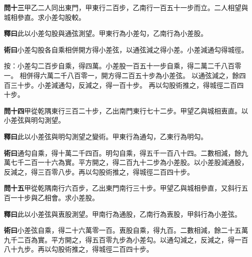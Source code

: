\documentclass[12pt,a4paper]{article}
\begin{document}
\noindent\textbf{問十三}\quad 甲乙二人同出東門，甲東行二百步，乙南行一百五十一步而立。二人相望與城相參直。求小差勾股較。

\vspace{0.3em}

\noindent\textbf{釋曰}\quad 此以小差勾股與通弦測望。甲東行為小差勾，乙南行為小差股。

\vspace{0.3em}

\noindent\textbf{術曰}\quad 小差勾股各自乘相併開方得小差弦，以通弦減之得小差。小差減通勾得城徑。

\vspace{0.3em}

\noindent
按：小差勾二百步自乘，得四萬。小差股一百五十一步自乘，得二萬二千八百零一。
相併得六萬二千八百零一，開方得二百五十步為小差弦。
以通弦減之，餘四百三十步。小差減通勾，反減之，得一百十步。
再以勾股術推之，得城徑二百四十步。

\vspace{0.5em}

\noindent\textbf{問十四}\quad 甲從乾隅東行三百二十步，乙出南門東行七十二步。甲望乙與城相叀直。以小差弦與明勾測望。

\vspace{0.3em}

\noindent\textbf{釋曰}\quad 此以小差弦與明勾測望之變術。甲東行為通勾，乙東行為明勾。

\vspace{0.3em}

\noindent\textbf{術曰}\quad 通勾自乘，得十萬二千四百。明勾自乘，得五千一百八十四。二數相減，餘九萬七千二百一十六為實。平方開之，得二百九十二步為小差股。以小差股減通股，反減之，得三百零八步。再以勾股術推之，得城徑二百四十步。

\vspace{0.5em}

\noindent\textbf{問十五}\quad 甲從乾隅南行六百步，乙出東門南行三十步。甲望乙與城相參直，又斜行五百一十步與乙相會。求小差股。

\vspace{0.3em}

\noindent\textbf{釋曰}\quad 此以小差弦與叀股測望。甲南行為通股，乙南行為叀股，甲斜行為小差弦。

\vspace{0.3em}

\noindent\textbf{術曰}\quad 小差弦自乘，得二十六萬零一百。叀股自乘，得九百。二數相減，餘二十五萬九千二百為實。平方開之，得五百零九步為小差勾。以通勾減之，反減之，得一百八十九步。再以勾股術推之，得城徑二百四十步。
\end{document}
